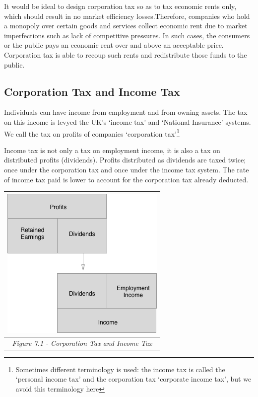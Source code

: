 \documentclass[]{tufte-handout}
\begin{document}
It would be ideal to design corporation tax so as to tax economic rents
only, which should result in no market efficiency losses.Therefore,
companies who hold a monopoly over certain goods and services collect
economic rent due to market imperfections such as lack of competitive
pressures. In such cases, the consumers or the public pays an economic
rent over and above an acceptable price. Corporation tax is able to
recoup such rents and redistribute those funds to the public.

\hypertarget{corporation-tax-and-income-tax}{%
\subsection{Corporation Tax and Income
Tax}\label{corporation-tax-and-income-tax}}

Individuals can have income from employment and from owning assets. The
tax on this income is levyed the UK's `income tax' and `National
Insurance' systems. We call the tax on profits of companies `corporation
tax'\footnote{Sometimes different terminology is used: the income tax is
  called the `personal income tax' and the corporation tax `corporate
  income tax', but we avoid this terminology here}

Income tax is not only a tax on employment income, it is also a tax on
distributed profits (dividends). Profits distributed as dividends are
taxed twice; once under the corporation tax and once under the income
tax system. The rate of income tax paid is lower to account for the
corporation tax already deducted.

\begin{longtable}[]{@{}c@{}}
\toprule
\includegraphics{ChapterPictures/7-1-IncTaxandCorpTax.png}\tabularnewline
\midrule
\endhead
\emph{Figure 7.1 - Corporation Tax and Income Tax}\tabularnewline
\bottomrule
\end{longtable}
\end{document}
